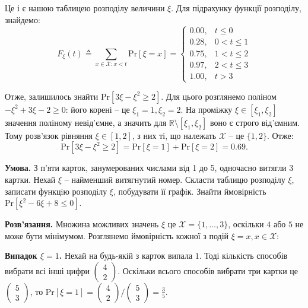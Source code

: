 \documentclass[oneside,solution]{karazin-prob-theory-assign}
\begin{document}
Це і є нашою таблицею розподілу величини $\xi$. Для підрахунку функції розподілу, знайдемо:
\begin{equation}
    F_{\xi}(t) \triangleq \sum_{x \in \mathcal{X}: x<t} \text{Pr}[\xi=x] = \begin{cases}
        0.00, & t \leq 0 \\
        0.28, & 0 < t \leq 1 \\
        0.75, & 1 < t \leq 2 \\
        0.97, & 2 < t \leq 3 \\
        1.00, & t > 3
    \end{cases}
\end{equation}

Отже, залишилось знайти $\text{Pr}[3\xi-\xi^2 \geq 2]$. Для цього розглянемо поліном $-\xi^2+3\xi - 2 \geq 0$: його корені -- це $\xi_1=1,\xi_2=2$. На проміжку $\xi \in [\xi_1,\xi_2]$ значення поліному невід'ємне, а значить для $\mathbb{R} \setminus [\xi_1,\xi_2]$ воно є строго від'ємним. Тому розв'язок рівняння $\xi \in [1,2]$, з них ті, що належать $\mathcal{X}$ -- це $\{1,2\}$. Отже:
\begin{equation}
    \text{Pr}[3\xi-\xi^2 \geq 2] = \text{Pr}[\xi=1] + \text{Pr}[\xi=2] = 0.69.
\end{equation}


\hspace{20px}\textbf{Умова.} З п’яти карток, занумерованих числами вiд 1 до 5, одночасно витягли 3 картки. Нехай $\xi$ -- найменший витягнутий номер. Скласти таблицю розподiлу $\xi$, записати функцiю розподiлу $\xi$, побудувати її графiк. Знайти ймовірність $\text{Pr}[\xi^2-6\xi+8 \leq 0]$.

\textbf{Розв'язання.} Множина можливих значень $\xi$ це $\mathcal{X} = \{1,\dots,3\}$, оскільки $4$ або $5$ не може бути мінімумом. Розглянемо ймовірність кожної з подій $\xi=x,x\in\mathcal{X}$:

\textbf{Випадок $\xi=1$.} Нехай на будь-якій з карток випала $1$. Тоді кількість способів вибрати всі інші цифри $\begin{pmatrix}
    4 \\ 2
\end{pmatrix}$. Оскільки всього способів вибрати три картки це $\begin{pmatrix}
    5 \\ 3
\end{pmatrix}$, то $\text{Pr}[\xi=1] = \begin{pmatrix}
    4 \\ 2
\end{pmatrix}/\begin{pmatrix}
    5 \\ 3
\end{pmatrix} = \frac{3}{5}$.
\end{document}
